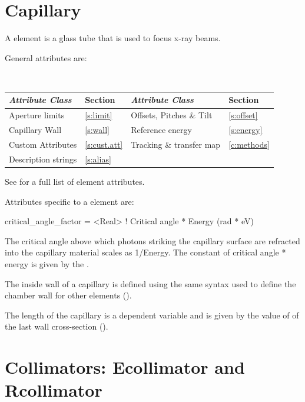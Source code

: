 \section{Capillary}
\label{s:capillary}

A  element is a glass tube that is used to focus x-ray
beams.

General  attributes are:
\begin{center}
\tt
\begin{tabular}{llll} \toprule
  {\sl Attribute Class}      & Section          & {\sl Attribute Class}      & Section         \\ \midrule
  Aperture limits            & \ref{s:limit}    & Offsets, Pitches \& Tilt   & \ref{s:offset}  \\ 
  Capillary Wall             & \ref{s:wall}     & Reference energy           & \ref{s:energy}  \\
  Custom Attributes          & \ref{s:cust.att} & Tracking \& transfer map   & \ref{c:methods} \\ 
  Description strings        & \ref{s:alias}    &                            &                 \\
  \bottomrule
\end{tabular}
\end{center}
\toffset
See  for a full list of element attributes.

Attributes specific to a  element are:
\begin{example}
  critical_angle_factor = <Real>    ! Critical angle * Energy (rad * eV)
\end{example}

The critical angle above which photons striking the capillary surface are
refracted into the capillary material scales as 1/Energy. The
constant of critical angle * energy is given by the .

The inside wall of a capillary is defined using the same syntax used
to define the chamber wall for other elements ().

The length of the capillary is a dependent variable and is given by
the value of  of the last wall cross-section
().

\section{Collimators: Ecollimator and Rcollimator} 
\label{s:col}

